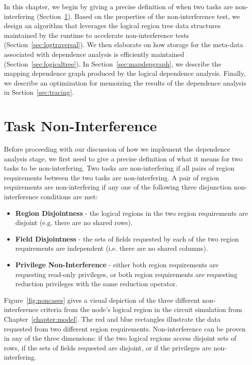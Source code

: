 In this chapter, we begin by giving a precise 
definition of when two tasks are non-interfering 
(Section~\ref{sec:noninterference}). Based on
the properties of the non-interference test,
we design an algorithm that leverages the logical
region tree data structures maintained by the
runtime to accelerate non-interference tests 
(Section~\ref{sec:logtraversal}). We then 
elaborate on how storage for the meta-data
associated with dependence analysis is
efficiently maintained 
(Section~\ref{sec:logicaltree}). In
Section~\ref{sec:mapdepgraph}, we describe
the mapping dependence graph produced by
the logical dependence analysis.
Finally, we describe an optimization 
for memoizing the results of the dependence 
analysis in Section~\ref{sec:tracing}.

\section{Task Non-Interference}
\label{sec:noninterference}

Before proceeding with our discussion of how
we implement the dependence analysis stage, we 
first need to give a precise definition of
what it means for two tasks to be non-interfering.
Two tasks are non-interfering if all pairs of region
requirements between the two tasks are 
non-interfering.  A pair of region requirements
are non-interfering if any one of the following
three disjunction non-interference conditions
are met:

\begin{itemize}
\item {\bf Region Disjointness} - the logical
regions in the two region requirements are disjoint
(e.g. there are no shared rows).
\item {\bf Field Disjointness} - the sets of fields
requested by each of the two region requirements
are independent (i.e. there are no shared columns).
\item {\bf Privilege Non-Interference} - either
both region requirements are requesting read-only
privileges, or both region requirements are 
requesting reduction privileges with the same
reduction operator.
\end{itemize}

Figure~\ref{fig:noncases} gives a visual depiction
of the three different non-interference criteria 
from the node's logical region in the circuit 
simulation from Chapter~\ref{chapter:model}. 
The red and blue rectangles illustrate the data
requested from two different region requirements.
Non-interference can be proven in any of the three
dimensions: if the two logical regions access
disjoint sets of rows, if the sets of fields requested
are disjoint, or if the privileges are non-interfering.


